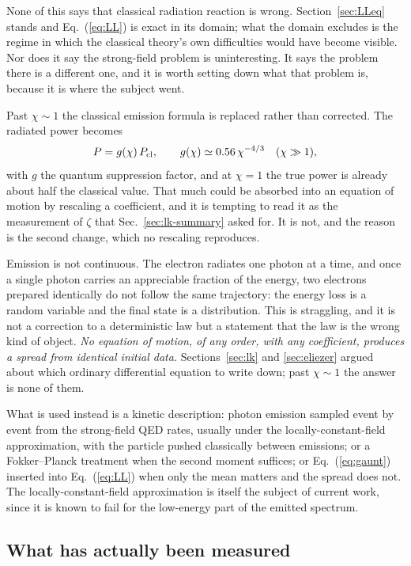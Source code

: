 \documentclass[preprint]{aastex701}
\begin{document}
None of this says that classical radiation reaction is wrong.
Section~\ref{sec:LLeq} stands and Eq.~(\ref{eq:LL}) is exact in its domain;
what the domain excludes is the regime in which the classical theory's own
difficulties would have become visible. Nor does it say the strong-field
problem is uninteresting. It says the problem there is a different one, and it
is worth setting down what that problem is, because it is where the subject
went.

Past $\chi\sim1$ the classical emission formula is replaced rather than
corrected. The radiated power becomes
\begin{equation}
P = g(\chi)\,P_{\rm cl},
\qquad
g(\chi)\simeq 0.56\,\chi^{-4/3} \quad (\chi\gg1),
\label{eq:gaunt}
\end{equation}
with $g$ the quantum suppression factor, and at $\chi=1$ the true power is
already about half the classical value. That much could be absorbed into an
equation of motion by rescaling a coefficient, and it is tempting to read it as
the measurement of $\zeta$ that Sec.~\ref{sec:lk-summary} asked for. It is not,
and the reason is the second change, which no rescaling reproduces.

Emission is not continuous. The electron radiates one photon at a time, and
once a single photon carries an appreciable fraction of the energy, two
electrons prepared identically do not follow the same trajectory: the energy
loss is a random variable and the final state is a distribution. This is
straggling, and it is not a correction to a deterministic law but a
statement that the law is the wrong kind of object. \emph{No equation of
motion, of any order, with any coefficient, produces a spread from identical
initial data.} Sections~\ref{sec:lk} and \ref{sec:eliezer} argued about which
ordinary differential equation to write down; past $\chi\sim1$ the answer is
none of them.

What is used instead is a kinetic description: photon emission sampled
event by event from the strong-field QED rates, usually under the
locally-constant-field approximation, with the particle pushed classically
between emissions; or a Fokker--Planck treatment when the second moment
suffices; or Eq.~(\ref{eq:gaunt}) inserted into Eq.~(\ref{eq:LL}) when only the
mean matters and the spread does not. The locally-constant-field approximation
is itself the subject of current work, since it is known to fail for the
low-energy part of the emitted spectrum.

\subsection{What has actually been measured}
\label{sec:experiment}
\end{document}
